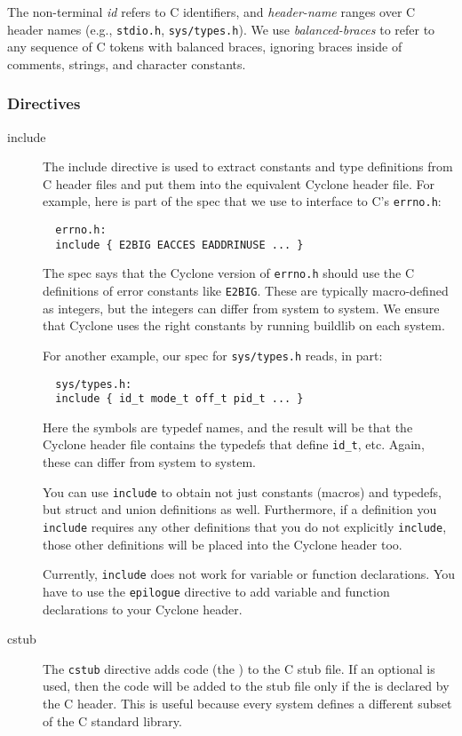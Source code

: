 The non-terminal \hypertarget{id}{\textit{id}} refers
to C identifiers, and \hypertarget{header-name}{\textit{header-name}}
ranges over C header names (e.g., \texttt{stdio.h},
\texttt{sys/types.h}).  We use
\hypertarget{balanced-braces}{\textit{balanced-braces}} to refer to any
sequence of C tokens with balanced braces, ignoring braces inside of
comments, strings, and character constants.

\subsubsection*{Directives}

\begin{description}
\item[include] The include directive is used to extract constants and
type definitions from C header files and put them into the equivalent
Cyclone header file.  For example, here is part of the spec that we
use to interface to C's \texttt{errno.h}:
\begin{verbatim}
  errno.h:
  include { E2BIG EACCES EADDRINUSE ... }
\end{verbatim}
The spec says that the Cyclone version of \texttt{errno.h} should use
the C definitions of error constants like \texttt{E2BIG}.  These are
typically macro-defined as integers, but the integers can differ from
system to system.  We ensure that Cyclone uses the right constants by
running buildlib on each system.

For another example, our spec for \texttt{sys/types.h} reads, in part:
\begin{verbatim}
  sys/types.h:
  include { id_t mode_t off_t pid_t ... }
\end{verbatim}
Here the symbols are typedef names, and the result will be that the
Cyclone header file contains the typedefs that define \texttt{id_t},
etc.  Again, these can differ from system to system.

You can use \texttt{include} to obtain not just constants (macros) and
typedefs, but struct and union definitions as well.  Furthermore, if a
definition you \texttt{include} requires any other definitions that
you do not explicitly \texttt{include}, those other definitions will
be placed into the Cyclone header too.

Currently, \texttt{include} does not work for variable or function
declarations.  You have to use the \texttt{epilogue} directive to add
variable and function declarations to your Cyclone header.

\item[cstub]
The \texttt{cstub} directive adds code (the )
to the C stub file.  If an optional  is used, then the code
will be added to the stub file only if the  is declared by the
C header.  This is useful because every system defines a different
subset of the C standard library.


\end{description}
